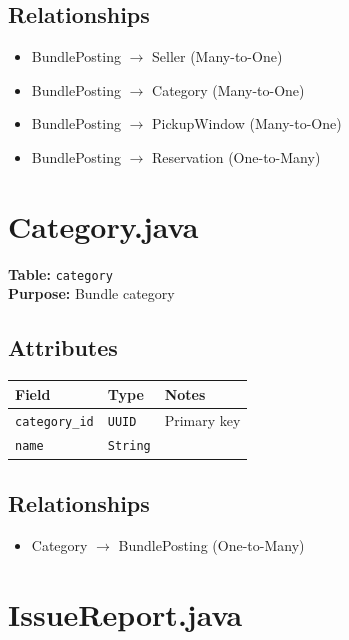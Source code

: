 \documentclass[a4paper,11pt]{article}
\begin{document}
\subsection*{Relationships}
\begin{itemize}
  \item BundlePosting $\rightarrow$ Seller (Many-to-One)
  \item BundlePosting $\rightarrow$ Category (Many-to-One)
  \item BundlePosting $\rightarrow$ PickupWindow (Many-to-One)
  \item BundlePosting $\rightarrow$ Reservation (One-to-Many)

  
\end{itemize}

\section{Category.java}

\textbf{Table:} \texttt{category} \\
\textbf{Purpose:} Bundle category

\subsection*{Attributes}
\begin{longtable}{|p{4cm}|p{3cm}|p{6cm}|}
\hline
\textbf{Field} & \textbf{Type} & \textbf{Notes} \\
\hline
\texttt{category\_id} & \texttt{UUID} & Primary key \\
\texttt{name} & \texttt{String} &  \\
\hline
\end{longtable}

\subsection*{Relationships}
\begin{itemize}
  \item Category $\rightarrow$ BundlePosting (One-to-Many)
\end{itemize}



\section{IssueReport.java}
\end{document}
